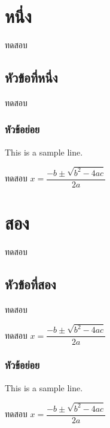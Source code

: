 \documentclass{report}
\begin{document}
\chapter{หนึ่ง}

ทดสอบ

\section{หัวข้อที่หนึ่ง}

ทดสอบ

\subsection{หัวข้อย่อย}

This is a sample line.

\begin{theorem}
ทดสอบ $x = \dfrac{-b\pm\sqrt{b^2-4ac}}{2a}$
\end{theorem}


\chapter{สอง}

ทดสอบ

\section{หัวข้อที่สอง}

ทดสอบ

\begin{theorem}
ทดสอบ $x = \dfrac{-b\pm\sqrt{b^2-4ac}}{2a}$
\end{theorem}

\subsection{หัวข้อย่อย}

This is a sample line.

\begin{theorem}
ทดสอบ $x = \dfrac{-b\pm\sqrt{b^2-4ac}}{2a}$
\end{theorem}
\end{document}
